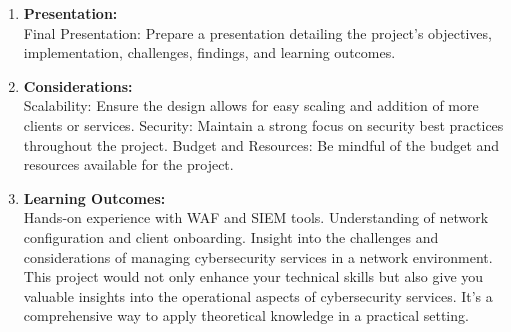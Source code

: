\documentclass{article}
\begin{document}
\begin{enumerate}
\begin{enumerate}
			\item \textbf{Presentation:}\\
			Final Presentation: Prepare a presentation detailing the project’s objectives, implementation, challenges, findings, and learning outcomes.
			\item \textbf{Considerations:}\\
			Scalability: Ensure the design allows for easy scaling and addition of more clients or services.
			Security: Maintain a strong focus on security best practices throughout the project.
			Budget and Resources: Be mindful of the budget and resources available for the project.
			\item \textbf{Learning Outcomes:}\\
			Hands-on experience with WAF and SIEM tools.
			Understanding of network configuration and client onboarding.
			Insight into the challenges and considerations of managing cybersecurity services in a network environment.\\
			This project would not only enhance your technical skills but also give you valuable insights into the operational aspects of cybersecurity services. It's a comprehensive way to apply theoretical knowledge in a practical setting.\\
		\end{enumerate}		
	\end{enumerate}
	\label{LastPage}
	
\end{document}
